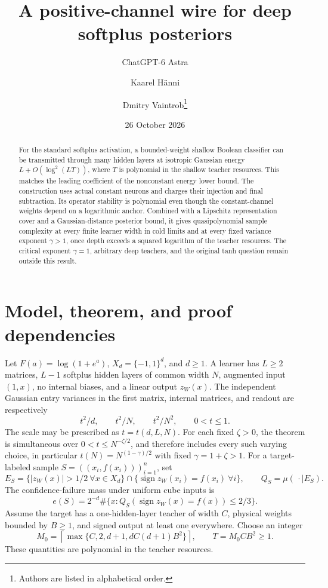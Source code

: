 \documentclass[11pt]{article}
\title{A positive-channel wire for deep softplus posteriors}
\author{ChatGPT-6 Astra \and Kaarel H\"anni \and Dmitry Vaintrob\thanks{Authors are listed in alphabetical order.}}
\date{26 October 2026}
\theoremstyle{remark}\newtheorem{remark}[theorem]{Remark}
\begin{document}
\maketitle
\begin{abstract}
For the standard softplus activation, a bounded-weight shallow Boolean
classifier can be transmitted through many hidden layers at isotropic
Gaussian energy $L+O(\log^2(LT))$, where $T$ is polynomial in the shallow
teacher resources. This matches the leading coefficient of the
nonconstant energy lower bound. The construction uses actual constant
neurons and charges their injection and final subtraction. Its operator
stability is polynomial even though the constant-channel weights depend
on a logarithmic anchor. Combined with a Lipschitz representation cover
and a Gaussian-distance posterior bound, it gives quasipolynomial
sample complexity at every finite learner width in cold limits and at
every fixed variance exponent $\gamma>1$, once depth exceeds a squared
logarithm of the teacher resources. The critical exponent $\gamma=1$,
arbitrary deep teachers, and the original tanh question remain outside
this result.
\end{abstract}

\section{Model, theorem, and proof dependencies}

Let $F(a)=\log(1+e^a)$, $X_d=\{-1,1\}^d$, and $d\ge1$. A learner has
$L\ge2$ matrices, $L-1$ softplus hidden layers of common width $N$,
augmented input $(1,x)$, no internal biases, and a linear output $z_W(x)$.
The independent Gaussian entry variances in the first matrix, internal
matrices, and readout are respectively
\[
 t^2/d,\qquad t^2/N,\qquad t^2/N^2,\qquad 0<t\le1.
\]
The scale may be prescribed as $t=t(d,L,N)$. For each fixed $\zeta>0$, the theorem is simultaneous
over $0<t\le N^{-\zeta/2}$, and therefore includes every such varying
choice, in particular $t(N)=N^{(1-\gamma)/2}$ with fixed
$\gamma=1+\zeta>1$.
For a target-labeled sample $S=((x_i,f(x_i)))_{i=1}^n$, set
\[
 E_S=\{|z_W(x)|>1/2\ \forall x\in X_d\}
 \cap\{\operatorname{sign}z_W(x_i)=f(x_i)\ \forall i\},
 \qquad Q_S=\mu(\,\cdot\mid E_S).
\]
The confidence-failure mass under uniform cube inputs is
\[
 e(S)=2^{-d}\#\{x:Q_S(\operatorname{sign}z_W(x)=f(x))\le2/3\}.
\]
Assume the target has a one-hidden-layer teacher of width $C$, physical
weights bounded by $B\ge1$, and signed output at least one everywhere.
Choose an integer
\[
 M_0=\left\lceil\max\{C,2,d+1,dC(d+1)B^2\}\right\rceil,
 \qquad T=M_0CB^2\ge1.
\]
These quantities are polynomial in the teacher resources.
\end{document}
